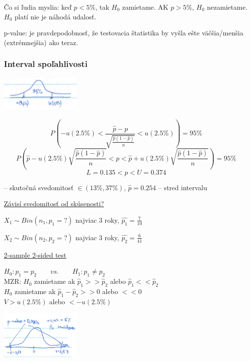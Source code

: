 \documentclass[unknownkeysallowed]{article}
\begin{document}
Čo si ľudia myslia: keď $p<5\%$, tak $H_0$ zamietame. AK $p>5\%$, $H_0$ nezamietame. $H_0$ platí nie je náhodá udalosť.

p-value: je pravdepodobnosť, že testovacia štatistika by vyšla ešte väčšia/menšia (extrémnejšia) ako teraz.

\subsubsection*{Interval spoľahlivosti}

\includegraphics[width=0.3\textwidth]{imgs/obr23.png}

$$P(-u(2.5\%) < \frac{\hat{p}-p}{\sqrt{\frac{\hat{p}(1-\hat{p})}{n}}} < u(2.5\%)) = 95\%$$
$$P(\hat{p}-u(2.5\%)\sqrt{\frac{\hat{p}(1-\hat{p})}{n}} < p < \hat{p} + u(2.5\%)\sqrt{\frac{\hat{p}(1-\hat{p})}{n}}) = 95\%$$
$$L = 0.135 < p < U = 0.374$$

-- skutočná svedomitosť $\in (13\%, 37\%)$, $\hat{p} = 0.254$ -- stred intervalu

\vspace{5mm}
\underline{Závisí svedomitosť od skúsenosti?}

$X_1 \sim Bin(n_1, p_1 = ?)$ najviac 3 roky, $\hat{p_1} = \frac{7}{10}$

$X_2 \sim Bin(n_2, p_2 = ?)$ najviac 3 roky, $\hat{p_2} = \frac{6}{41}$

\vspace{5mm}
\underline{2-sample 2-sided test}

\begin{multicols}{2}

$H_0: p_1=p_2 \qquad vs. \qquad H_1: p_1 \neq p_2$\\
MZR: $H_0$ zamietame ak $\hat{p}_1 >> \hat{p}_2$ alebo $\hat{p}_1 << \hat{p}_2$\\
$H_0$ zamietame ak $\hat{p}_1 - \hat{p}_2 >> 0$ alebo $<< 0$\\
$V > u(2.5\%)$ alebo $<-u(2.5\%)$

\columnbreak

\includegraphics[width=0.3\textwidth]{imgs/obr24.png}

\end{multicols}
\end{document}
